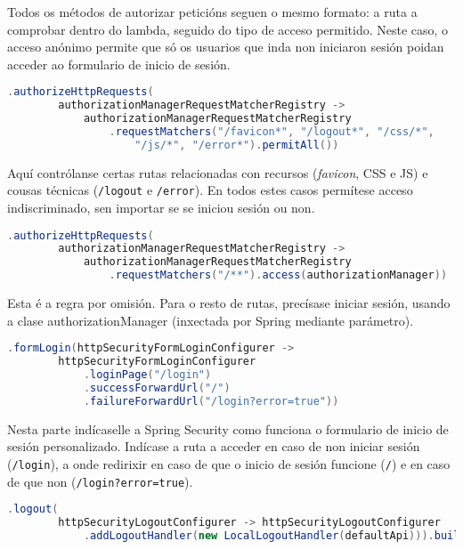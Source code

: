 Todos os métodos de autorizar peticións seguen o mesmo formato: a ruta a comprobar dentro do lambda, seguido do tipo de acceso permitido. Neste caso, o acceso anónimo permite que só os usuarios que inda non iniciaron sesión poidan acceder ao formulario de inicio de sesión.

\begin{lstlisting}[language=Java]
    .authorizeHttpRequests(
        authorizationManagerRequestMatcherRegistry ->
            authorizationManagerRequestMatcherRegistry
                .requestMatchers("/favicon*", "/logout*", "/css/*",
                    "/js/*", "/error*").permitAll())
\end{lstlisting}

Aquí contrólanse certas rutas relacionadas con recursos (\textit{favicon}, CSS e JS) e cousas técnicas (\texttt{/logout} e \texttt{/error}). En todos estes casos permítese acceso indiscriminado, sen importar se se iniciou sesión ou non.

\begin{lstlisting}[language=Java]
    .authorizeHttpRequests(
        authorizationManagerRequestMatcherRegistry ->
            authorizationManagerRequestMatcherRegistry
                .requestMatchers("/**").access(authorizationManager))
\end{lstlisting}

Esta é a regra por omisión. Para o resto de rutas, precísase iniciar sesión, usando a clase authorizationManager (inxectada por Spring mediante parámetro).

\begin{lstlisting}[language=Java]
    .formLogin(httpSecurityFormLoginConfigurer ->
        httpSecurityFormLoginConfigurer
            .loginPage("/login")
            .successForwardUrl("/")
            .failureForwardUrl("/login?error=true"))
\end{lstlisting}

Nesta parte indícaselle a Spring Security como funciona o formulario de inicio de sesión personalizado. Indícase a ruta a acceder en caso de non iniciar sesión (\texttt{/login}), a onde redirixir en caso de que o inicio de sesión funcione (\texttt{/}) e en caso de que non (\texttt{/login?error=true}).

\begin{lstlisting}[language=Java]
    .logout(
        httpSecurityLogoutConfigurer -> httpSecurityLogoutConfigurer
            .addLogoutHandler(new LocalLogoutHandler(defaultApi))).build();
\end{lstlisting}

